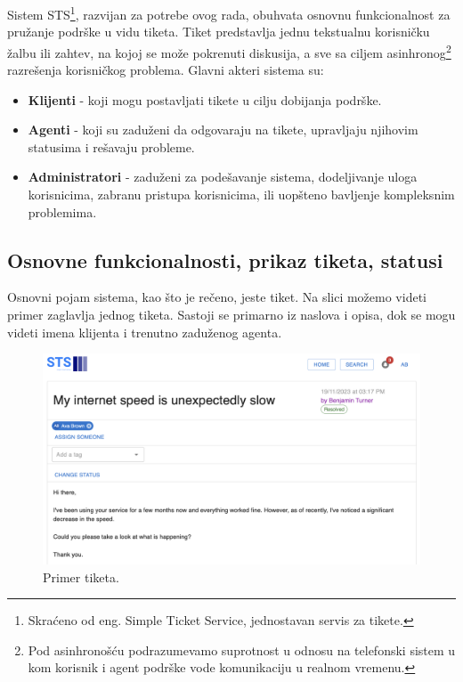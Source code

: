 \documentclass[12pt,oneside]{memoir}
\begin{document}
Sistem STS\footnote{Skraćeno od eng. Simple Ticket Service, jednostavan servis za tikete.}, razvijan za potrebe ovog rada, obuhvata osnovnu funkcionalnost za pružanje podrške u vidu tiketa. Tiket predstavlja jednu tekstualnu korisničku žalbu ili zahtev, na kojoj se može pokrenuti diskusija, a sve sa ciljem asinhronog\footnote{Pod asinhronošću podrazumevamo suprotnost u odnosu na telefonski sistem u kom korisnik i agent podrške vode komunikaciju u realnom vremenu.} razrešenja korisničkog problema. Glavni akteri sistema su:

\begin{itemize}
    \item \textbf{Klijenti} - koji mogu postavljati tikete u cilju dobijanja podrške.
    \item \textbf{Agenti} - koji su zaduženi da odgovaraju na tikete, upravljaju njihovim statusima i rešavaju probleme.
    \item \textbf{Administratori} - zaduženi za podešavanje sistema, dodeljivanje uloga korisnicima, zabranu pristupa korisnicima, ili uopšteno bavljenje kompleksnim problemima.
\end{itemize}

\subsection{Osnovne funkcionalnosti, prikaz tiketa, statusi}

Osnovni pojam sistema, kao što je rečeno, jeste tiket. Na slici možemo videti primer zaglavlja jednog tiketa. Sastoji se primarno iz naslova i opisa, dok se mogu videti imena klijenta i trenutno zaduženog agenta.

\begin{figure}[h]
  \centering
  \includegraphics[width=1\textwidth]{docs/images/ch_1/ticket-title.png} 
  \caption{Primer tiketa.}
\end{figure}
\end{document}
